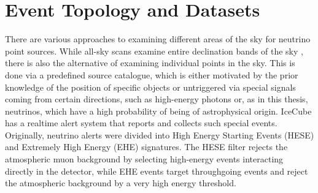 \chapter{Event Topology and Datasets} \label{sec:events_data}

%

There are various approaches to examining different areas of the sky for neutrino point sources.
While all-sky scans examine entire declination bands of the sky \cite{all_sky_paper}, there is also the alternative of examining individual points in the sky.
This is done via a predefined source catalogue, which is either motivated by the prior knowledge of the position of specific objects or untriggered via special signals coming from certain directions, such as high-energy photons or, as in this thesis, neutrinos, which have a high probability of being of astrophysical origin.
IceCube has a realtime alert system that reports and collects such special events.
Originally, neutrino alerts were divided into High Energy Starting Events (HESE) and Extremely High Energy (EHE) signatures.
The HESE filter rejects the atmospheric muon background by selecting high-energy events interacting directly in the detector, while EHE events target throughgoing events and reject the atmospheric background by a very high energy threshold.

